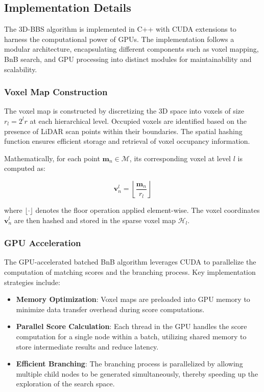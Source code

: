 \subsection{Implementation Details}
The 3D-BBS algorithm is implemented in C++ with CUDA extensions to harness the computational power of GPUs. The implementation follows a modular architecture, encapsulating different components such as voxel mapping, BnB search, and GPU processing into distinct modules for maintainability and scalability.

\subsubsection{Voxel Map Construction}
The voxel map is constructed by discretizing the 3D space into voxels of size $r_l = 2^l r$ at each hierarchical level. Occupied voxels are identified based on the presence of LiDAR scan points within their boundaries. The spatial hashing function ensures efficient storage and retrieval of voxel occupancy information.

Mathematically, for each point $\mathbf{m}_n \in \mathcal{M}$, its corresponding voxel at level $l$ is computed as:

$$\mathbf{v}_n^l = \left\lfloor \frac{\mathbf{m}_n}{r_l} \right\rfloor$$

where $\lfloor \cdot \rfloor$ denotes the floor operation applied element-wise. The voxel coordinates $\mathbf{v}_n^l$ are then hashed and stored in the sparse voxel map $\mathcal{H}_l$.

\subsubsection{GPU Acceleration}
The GPU-accelerated batched BnB algorithm leverages CUDA to parallelize the computation of matching scores and the branching process. Key implementation strategies include:

\begin{itemize}
    \item \textbf{Memory Optimization}: Voxel maps are preloaded into GPU memory to minimize data transfer overhead during score computations.
    \item \textbf{Parallel Score Calculation}: Each thread in the GPU handles the score computation for a single node within a batch, utilizing shared memory to store intermediate results and reduce latency.
    \item \textbf{Efficient Branching}: The branching process is parallelized by allowing multiple child nodes to be generated simultaneously, thereby speeding up the exploration of the search space.
\end{itemize}

